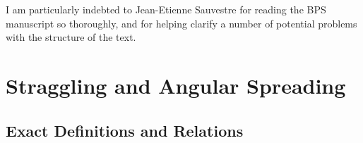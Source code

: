 \documentclass[preprint,12pt,eqsecnum,nofootinbib,amsmath,amssymb]{revtex4}
\begin{document}
\newpage

%
\begin{acknowledgments}
  I am particularly indebted to Jean-Etienne Sauvestre for reading 
  the BPS manuscript so thoroughly, and for helping clarify a number 
  of potential problems with the structure of the text. 
\end{acknowledgments}


\appendix

\section{Straggling and Angular Spreading}

\subsection{Exact Definitions and Relations}
\end{document}

